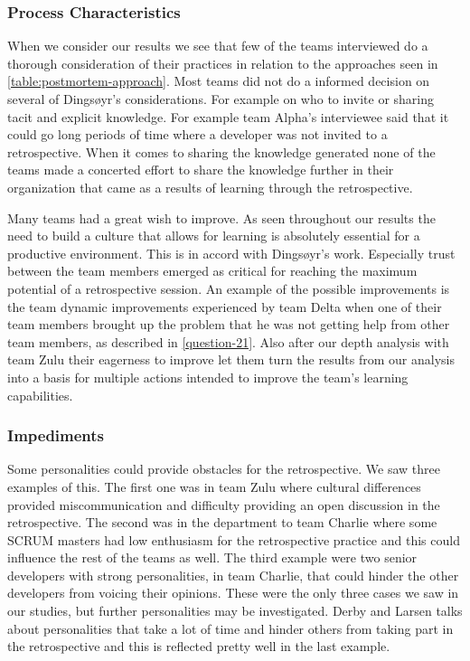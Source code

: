 \subsubsection{Process Characteristics }

When we consider our results we see that few of the teams interviewed do a thorough consideration of their practices in relation to the approaches seen in \autoref{table:postmortem-approach}. Most teams did not do a informed decision on several of Dingsøyr's considerations. For example on who to invite or sharing tacit and explicit knowledge. For example team Alpha's interviewee said that it could go long periods of time where a developer was not invited to a retrospective. When it comes to sharing the knowledge generated none of the teams made a concerted effort to share the knowledge further in their organization that came as a results of learning through the retrospective.

Many teams had a great wish to improve. As seen throughout our results the need to build a culture that allows for learning is absolutely essential for a productive environment. This is in accord with  Dingsøyr's work. Especially trust between the team members emerged as critical for reaching the maximum potential of a retrospective session. An example of the possible improvements is the team dynamic improvements experienced by team Delta when one of their team members brought up the problem that he was not getting help from other team members, as described in \autoref{question-21}. Also after our depth analysis with team Zulu their eagerness to improve let them turn the results from our analysis into a basis for multiple actions intended to improve the team's learning capabilities. 


\subsubsection{Impediments}

Some personalities could provide obstacles for the retrospective. We saw three examples of this. The first one was in team Zulu where cultural differences provided miscommunication and difficulty providing an open discussion in the retrospective. The second was in the department to team Charlie where some SCRUM masters had low enthusiasm for the retrospective practice and this could influence the rest of the teams as well. The third example were two senior developers with strong personalities, in team Charlie, that could hinder the other developers from voicing their opinions. These were the only three cases we saw in our studies, but further personalities may be investigated. Derby and Larsen \cite{Larsen2006} talks about personalities that take a lot of time and hinder others from taking part in the retrospective and this is reflected pretty well in the last example.

